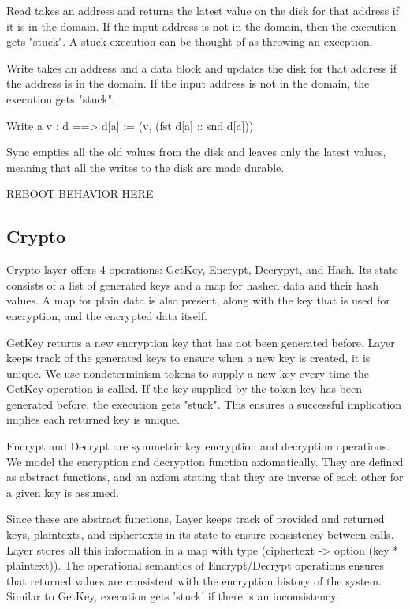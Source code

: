 Read takes an address and returns the latest value on the disk for that address if it is in the domain. If the input address is not in the domain, then the execution gets "stuck". A stuck execution can be thought of as throwing an exception.

Write takes an address and a data block and updates the disk for that address if the address is in the domain. If the input address is not in the domain, the execution gets "stuck".

Write a v : d ==> d[a] := (v, (fst d[a] :: snd d[a]))

Sync empties all the old values from the disk and leaves only the latest values, meaning that all the writes to the disk are made durable.

{\color{red} REBOOT BEHAVIOR HERE}

\subsection{Crypto}
Crypto layer offers 4 operations: GetKey, Encrypt, Decrypyt, and Hash. Its state consists of a list of generated keys and a map for hashed data and their hash values. A map for plain data is also present, along with the key that is used for encryption, and the encrypted data itself.

GetKey returns a new encryption key that has not been generated before.
Layer keeps track of the generated keys to ensure when a new key is created, it is unique. We use nondeterminism tokens to supply a new key every time the GetKey operation is called. If the key supplied by the token key has been generated before, the execution gets "stuck". This ensures a successful implication implies each returned key is unique.

Encrypt and Decrypt are symmetric key encryption and decryption operations.
We model the encryption and decryption function axiomatically. They are defined as abstract functions, and an axiom stating that they are inverse of each other for a given key is assumed.

Since these are abstract functions, Layer keeps track of provided and returned keys, plaintexts, and ciphertexts in its state to ensure consistency between calls. Layer stores all this information in a map with type (ciphertext -> option (key  * plaintext)). The operational semantics of Encrypt/Decrypt operations ensures that returned values are consistent with the encryption history of the system. Similar to GetKey, execution gets 'stuck' if there is an inconsistency. 

